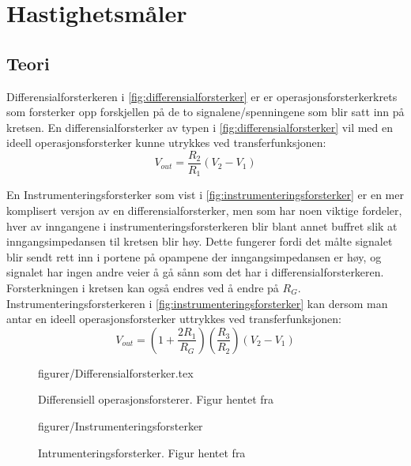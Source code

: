 



\section{Hastighetsmåler}
\subsection{Teori}
Differensialforsterkeren i \autoref{fig:differensialforsterker} er er operasjonsforsterkerkrets som forsterker opp forskjellen på de to signalene/spenningene som blir satt inn på kretsen. En differensialforsterker av typen i \autoref{fig:differensialforsterker} vil med en ideell operasjonsforsterker kunne utrykkes ved transferfunksjonen\cite{Johnson}:
\begin{equation}
    V_{out} = \frac{R_2}{R_1}(V_2-V_1)
    \label{eq:differensialforsterker}
\end{equation}

En Instrumenteringsforsterker som vist i \autoref{fig:instrumenteringsforsterker} er en mer komplisert versjon av en differensialforsterker, men som har noen viktige fordeler, hver av inngangene i instrumenteringsforsterkeren blir blant annet buffret slik at inngangsimpedansen til kretsen blir høy. Dette fungerer fordi det målte signalet blir sendt rett inn i portene på opampene der inngangsimpedansen er høy, og signalet har ingen andre veier å gå sånn som det har i differensialforsterkeren. Forsterkningen i kretsen kan også endres ved å endre på $R_G$. Instrumenteringsforsterkeren i \autoref{fig:instrumenteringsforsterker} kan dersom man antar en ideell operasjonsforsterker uttrykkes ved transferfunksjonen:
\begin{equation}
    V_{out} = (1+\frac{2R_1}{R_G})(\frac{R_3}{R_2})(V_2-V_1)
    \label{eq:instrumenteringsforsterker}
\end{equation}


\begin{figure} [h]
     {figurer/Differensialforsterker.tex}
    \caption{Differensiell operasjonsforsterer. Figur hentet fra \cite{Johnson}}
    \label{fig:differensialforsterker}
\end{figure}


\begin{figure} [h]
    \centering
     {figurer/Instrumenteringsforsterker}
    \caption{Intrumenteringsforsterker. Figur hentet fra \cite{Johnson}}
    \label{fig:instrumenteringsforsterker}
\end{figure}



